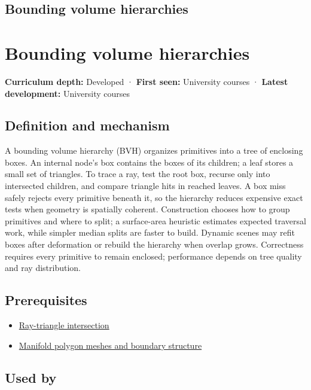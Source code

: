 \hypertarget{appendix-0b426c47dd78}{}
\section*{Bounding volume hierarchies}
\chapter{Bounding volume hierarchies}\label{appendix-0b426c47dd78-bounding-volume-hierarchies}

\textbf{Curriculum depth:} Developed · \textbf{First seen:} University courses · \textbf{Latest development:} University courses

\section{Definition and mechanism}\label{appendix-0b426c47dd78-definition-and-mechanism}

A bounding volume hierarchy (BVH) organizes primitives into a tree of enclosing boxes. An internal node's box contains the boxes of its children; a leaf stores a small set of triangles. To trace a ray, test the root box, recurse only into intersected children, and compare triangle hits in reached leaves. A box miss safely rejects every primitive beneath it, so the hierarchy reduces expensive exact tests when geometry is spatially coherent. Construction chooses how to group primitives and where to split; a surface-area heuristic estimates expected traversal work, while simpler median splits are faster to build. Dynamic scenes may refit boxes after deformation or rebuild the hierarchy when overlap grows. Correctness requires every primitive to remain enclosed; performance depends on tree quality and ray distribution.

\section{Prerequisites}\label{appendix-0b426c47dd78-prerequisites}

\begin{itemize}
\tightlist
\item
  \hyperref[appendix-47ac1bd6d144]{Ray-triangle intersection}
\item
  \hyperref[appendix-fab348609369]{Manifold polygon meshes and boundary structure}
\end{itemize}

\section{Used by}\label{appendix-0b426c47dd78-used-by}

